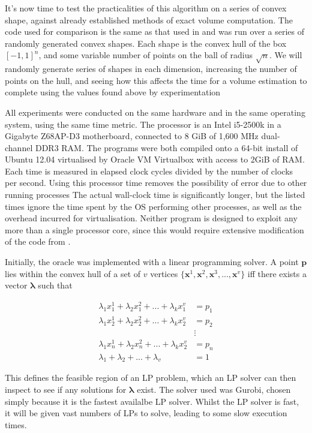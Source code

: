 It's now time to test the practicalities of this algorithm on a series of convex shape, against already established methods of exact volume computation. The code used for comparison is the same as that used in \cite{Bueler98}
and was run over a series of randomly generated convex shapes. Each shape is the convex hull of the box $[-1,1]^n$, and some variable number of points on the ball of radius $\sqrt n$. We will randomly generate series of shapes in each dimension, increasing the number of points on the hull, and seeing how this affects the time for a volume estimation to complete using the values found above by experimentation

All experiments were conducted on the same hardware and in the same operating system, using the same time metric. The processor is an Intel i5-2500k in a Gigabyte Z68AP-D3 motherboard, connected to 8 GiB of 1,600 MHz dual-channel DDR3 RAM. The programs were both compiled onto a 64-bit install of Ubuntu 12.04 virtualised by Oracle VM Virtualbox with access to 2GiB of RAM. Each time is measured in elapsed clock cycles divided by the number of clocks per second. Using this processor time removes the possibility of error due to other running processes The actual wall-clock time is significantly longer, but the listed times ignore the time spent by the OS performing other processes, as well as the overhead incurred for virtualisation. Neither program is designed to exploit any more than a single processor core, since this would require extensive modification of the code from \cite{Bueler98}.

Initially, the oracle was implemented with a linear programming solver. A point ${\bm p}$ lies within the convex hull of a set of $v$ vertices $\{{\bm x}^1, {\bm x}^2, {\bm x}^3, ..., {\bm x}^v\}$ iff there exists a vector ${\bm \lambda}$ such that

\begin{align*}
\lambda_1 x^1_1 + \lambda_2 x^2_1 + ... + \lambda_k x^v_1 &= p_1 \\
\lambda_1 x^1_2 + \lambda_2 x^2_2 + ... + \lambda_k x^v_2 &= p_2 \\
&\vdots \\
\lambda_1 x^1_n + \lambda_2 x^2_n + ... + \lambda_k x^v_2 &= p_n \\
\lambda_1 + \lambda_2 + ... + \lambda_v &= 1
\end{align*}

This defines the feasible region of an LP problem, which an LP solver can then inspect to see if any solutions for ${\bm \lambda}$ exist. The solver used was Gurobi, chosen simply because it is the fastest availalbe LP solver. Whilst the LP solver is fast, it will be given vast numbers of LPs to solve, leading to some slow execution times.

